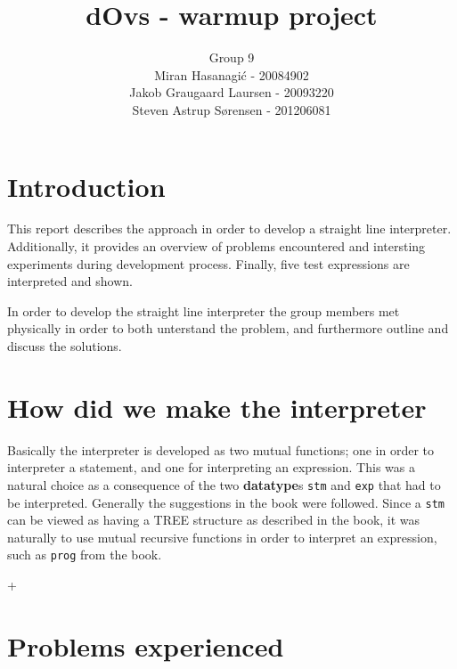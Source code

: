 \documentclass[a4paper]{article}
\title{dOvs - warmup project}
\author{
  Group 9 \\
  Miran Hasanagi\'{c} - 20084902 \\
  Jakob Graugaard Laursen - 20093220\\
  Steven Astrup S\o rensen - 201206081
}
\begin{document}
\maketitle

\section{Introduction}

This report describes the approach in order to develop a straight line interpreter. Additionally, it provides an overview of problems encountered and intersting experiments during development process. Finally, five test expressions are interpreted and shown.

In order to develop the straight line interpreter the group members met physically in order to both unterstand the problem, and furthermore outline and discuss the solutions.

\section{How did we make the interpreter}

Basically the interpreter is developed as two mutual functions; one in order to interpreter a statement, and one for interpreting an expression. This was a natural choice as a consequence of the two \textbf{datatype}s \texttt{stm} and \texttt{exp} that had to be interpreted. Generally the suggestions in the book were followed. Since a \texttt{stm} can be viewed as having a TREE structure as described in the book, it was naturally to use mutual recursive functions in order to interpret an expression, such as \texttt{prog} from the book. 

+%


\section{Problems experienced}
\end{document}
